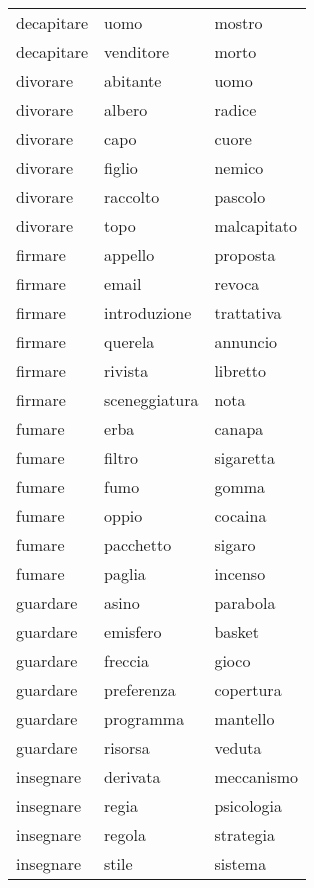 \begin{longtable}{l|ll}
decapitare     & uomo          & mostro       \\
decapitare     & venditore     & morto        \\
divorare       & abitante      & uomo         \\
divorare       & albero        & radice       \\
divorare       & capo          & cuore        \\
divorare       & figlio        & nemico       \\
divorare       & raccolto      & pascolo      \\
divorare       & topo          & malcapitato  \\
firmare        & appello       & proposta     \\
firmare        & email         & revoca       \\
firmare        & introduzione  & trattativa   \\
firmare        & querela       & annuncio     \\
firmare        & rivista       & libretto     \\
firmare        & sceneggiatura & nota         \\
fumare         & erba          & canapa       \\
fumare         & filtro        & sigaretta    \\
fumare         & fumo          & gomma        \\
fumare         & oppio         & cocaina      \\
fumare         & pacchetto     & sigaro       \\
fumare         & paglia        & incenso      \\
guardare       & asino         & parabola     \\
guardare       & emisfero      & basket       \\
guardare       & freccia       & gioco        \\
guardare       & preferenza    & copertura    \\
guardare       & programma     & mantello     \\
guardare       & risorsa       & veduta       \\
insegnare      & derivata      & meccanismo   \\
insegnare      & regia         & psicologia   \\
insegnare      & regola        & strategia    \\
insegnare      & stile         & sistema      \\

\end{longtable}
